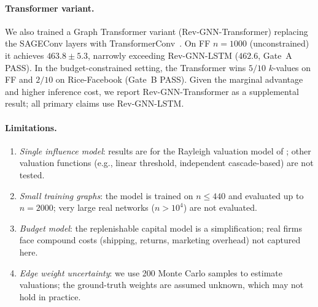 \paragraph{Transformer variant.}
We also trained a Graph Transformer variant (Rev-GNN-Transformer) replacing the
SAGEConv layers with TransformerConv~\citep{shi2021masked}.
On FF $n{=}1000$ (unconstrained) it achieves $463.8 \pm 5.3$, %
narrowly exceeding Rev-GNN-LSTM ($462.6$, Gate~A PASS). %
In the budget-constrained setting, the Transformer wins $5/10$ $k$-values on FF
and $2/10$ on Rice-Facebook (Gate~B PASS). %
Given the marginal advantage and higher inference cost, we report
Rev-GNN-Transformer as a supplemental result; all primary claims use Rev-GNN-LSTM.

\paragraph{Limitations.}
\begin{enumerate}[leftmargin=*,topsep=2pt,itemsep=1pt]
  \item \emph{Single influence model}: results are for the Rayleigh valuation model
    of \citet{babaei2013revenue}; other valuation functions (e.g., linear threshold,
    independent cascade-based) are not tested.
  \item \emph{Small training graphs}: the model is trained on $n \le 440$ and
    evaluated up to $n{=}2000$; very large real networks ($n > 10^4$) are not
    evaluated.
  \item \emph{Budget model}: the replenishable capital model is a simplification;
    real firms face compound costs (shipping, returns, marketing overhead) not
    captured here.
  \item \emph{Edge weight uncertainty}: we use 200 Monte Carlo samples to estimate
    valuations; the ground-truth weights are assumed unknown, which may not hold
    in practice.
\end{enumerate}
